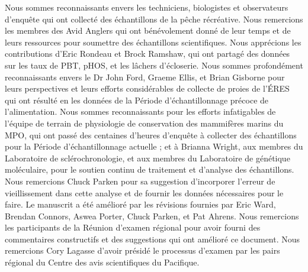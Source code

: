 \documentclass[11pt]{book}
\begin{document}
Nous sommes reconnaissants envers les techniciens, biologistes et observateurs d'enquête qui ont collecté des échantillons de la pêche récréative. Nous remercions les membres des Avid Anglers qui ont bénévolement donné de leur temps et de leurs ressources pour soumettre des échantillons scientifiques. Nous apprécions les contributions d'Eric Rondeau et Brock Ramshaw, qui ont partagé des données sur les taux de PBT, pHOS, et les lâchers d'écloserie. Nous sommes profondément reconnaissants envers le Dr John Ford, Graeme Ellis, et Brian Gisborne pour leurs perspectives et leurs efforts considérables de collecte de proies de l'ÉRES qui ont résulté en les données de la Période d'échantillonnage précoce de l'alimentation. Nous sommes reconnaissants pour les efforts infatigables de l'équipe de terrain de physiologie de conservation des mammifères marins du MPO, qui ont passé des centaines d'heures d'enquête à collecter des échantillons pour la Période d'échantillonnage actuelle ; et à Brianna Wright, aux membres du Laboratoire de sclérochronologie, et aux membres du Laboratoire de génétique moléculaire, pour le soutien continu de traitement et d'analyse des échantillons. Nous remercions Chuck Parken pour sa suggestion d'incorporer l'erreur de vieillissement dans cette analyse et de fournir les données nécessaires pour le faire. Le manuscrit a été amélioré par les révisions fournies par Eric Ward, Brendan Connors, Aswea Porter, Chuck Parken, et Pat Ahrens. Nous remercions les participants de la Réunion d'examen régional pour avoir fourni des commentaires constructifs et des suggestions qui ont amélioré ce document. Nous remercions Cory Lagasse d'avoir présidé le processus d'examen par les pairs régional du Centre des avis scientifiques du Pacifique.



\clearpage

\Appendices

\clearpage

\renewcommand{\thechapter}{A}

\clearpage

\renewcommand{\thechapter}{B}

\clearpage

\renewcommand{\thechapter}{C}

\clearpage

\renewcommand{\thechapter}{D}

\clearpage
\end{document}
